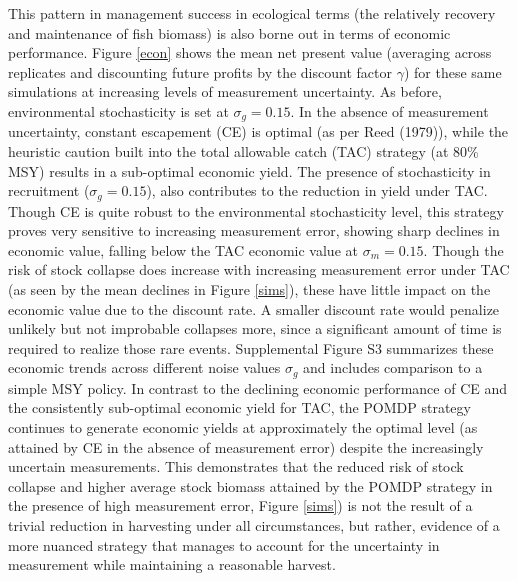 \documentclass[3p]{elsarticle} %
\begin{document}
This pattern in management success in ecological terms (the relatively
recovery and maintenance of fish biomass) is also borne out in terms of
economic performance. Figure \ref{econ} shows the mean net present value
(averaging across replicates and discounting future profits by the
discount factor \(\gamma\)) for these same simulations at increasing
levels of measurement uncertainty. As before, environmental
stochasticity is set at \(\sigma_g = 0.15\). In the absence of
measurement uncertainty, constant escapement (CE) is optimal (as per
Reed (1979)), while the heuristic caution built into the total allowable
catch (TAC) strategy (at 80\% MSY) results in a sub-optimal economic
yield. The presence of stochasticity in recruitment
(\(\sigma_g = 0.15\)), also contributes to the reduction in yield under
TAC. Though CE is quite robust to the environmental stochasticity level,
this strategy proves very sensitive to increasing measurement error,
showing sharp declines in economic value, falling below the TAC economic
value at \(\sigma_m = 0.15\). Though the risk of stock collapse does
increase with increasing measurement error under TAC (as seen by the
mean declines in Figure \ref{sims}), these have little impact on the
economic value due to the discount rate. A smaller discount rate would
penalize unlikely but not improbable collapses more, since a significant
amount of time is required to realize those rare events. Supplemental
Figure S3 summarizes these economic trends across different noise values
\(\sigma_g\) and includes comparison to a simple MSY policy. In contrast
to the declining economic performance of CE and the consistently
sub-optimal economic yield for TAC, the POMDP strategy continues to
generate economic yields at approximately the optimal level (as attained
by CE in the absence of measurement error) despite the increasingly
uncertain measurements. This demonstrates that the reduced risk of stock
collapse and higher average stock biomass attained by the POMDP strategy
in the presence of high measurement error, Figure \ref{sims}) is not the
result of a trivial reduction in harvesting under all circumstances, but
rather, evidence of a more nuanced strategy that manages to account for
the uncertainty in measurement while maintaining a reasonable harvest.
\end{document}
